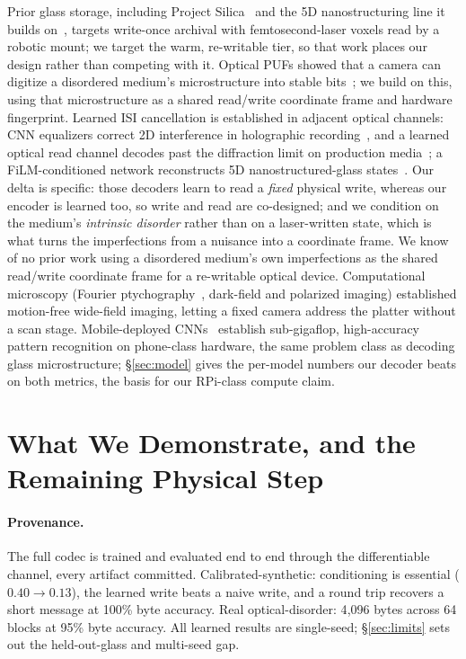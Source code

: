 \documentclass[letterpaper,twocolumn,10pt]{article}
\begin{document}
Prior glass storage, including Project
Silica~\cite{silica_sosp23,silica_tos25,silica_nature26} and the 5D
nanostructuring line it builds on~\cite{kazansky_5d_prl14,wang_100layer_lpr22},
targets write-once archival with femtosecond-laser voxels read by a robotic
mount; we target the warm, re-writable tier, so that work places our design
rather than competing with it. Optical PUFs showed that a camera can digitize a
disordered medium's microstructure into stable bits~\cite{pappu_puf_science02};
we build on this, using that microstructure as a shared read/write coordinate
frame and hardware fingerprint.
Learned ISI cancellation is established in adjacent optical channels: CNN equalizers correct
2D interference in holographic recording~\cite{nguyen_cnn_hds23}, and a learned optical read
channel decodes past the diffraction limit on production media~\cite{liu_decods26}; a
FiLM-conditioned network reconstructs 5D nanostructured-glass
states~\cite{film_5d_storage_arxiv25}. Our delta is specific: those decoders
learn to read a \emph{fixed} physical write, whereas our encoder is learned too,
so write and read are co-designed; and we condition on the medium's
\emph{intrinsic disorder} rather than on a laser-written state, which is what
turns the imperfections from a nuisance into a coordinate frame. We know of no prior
work using a disordered medium's own imperfections as the shared read/write coordinate
frame for a re-writable optical device. Computational microscopy (Fourier
ptychography~\cite{fourier_ptychography13}, dark-field and polarized imaging) established
motion-free wide-field imaging, letting a fixed camera address the platter without a scan
stage. Mobile-deployed CNNs~\cite{mobilenetv2_cvpr18,mobilenetv3_iccv19,mobilefacenets18}
establish sub-gigaflop, high-accuracy pattern recognition on phone-class hardware, the
same problem class as decoding glass microstructure; \S\ref{sec:model} gives the
per-model numbers our decoder beats on both metrics, the basis for our RPi-class
compute claim.

\section{What We Demonstrate, and the Remaining Physical Step}
\label{sec:demo}
\paragraph{Provenance.} The full codec is trained and evaluated end to end through the
differentiable channel, every artifact committed. Calibrated-synthetic: conditioning is
essential ($0.40\!\rightarrow\!0.13$), the learned write beats a naive write, and a
round trip recovers a short message at 100\% byte accuracy. Real optical-disorder:
4{,}096 bytes across 64 blocks at 95\% byte accuracy. All learned results are
single-seed; \S\ref{sec:limits} sets out the held-out-glass and multi-seed gap.
\end{document}

